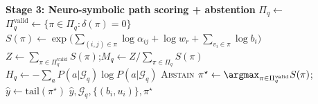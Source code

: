 \begin{algorithm}[t]
\begin{algorithmic}[1]
\Statex \textbf{Stage 3: Neuro-symbolic path scoring + abstention}
\State $\Pi_q \gets$ 
\State $\Pi_q^{\text{valid}} \gets \{\pi \in \Pi_q : \delta(\pi) = 0\}$
\State $S(\pi) \gets \exp\big(\sum_{(i,j)\in\pi}\log\alpha_{ij} + \log w_r + \sum_{v_i \in \pi}\log b_i\big)$
\State $Z \gets \sum_{\pi \in \Pi_q^{\text{valid}}} S(\pi)$;\quad $M_q \gets Z / \sum_{\pi \in \Pi_q} S(\pi)$
\State $H_q \gets -\sum_a P(a|\mathcal{G}_q)\log P(a|\mathcal{G}_q)$
  \State \Return \textsc{Abstain}
\Else
  \State $\pi^\star \gets \argmax_{\pi \in \Pi_q^{\text{valid}}} S(\pi)$;\quad $\hat{y} \gets \text{tail}(\pi^\star)$
  \State \Return $\hat{y}, \mathcal{G}_q, \{(b_i, u_i)\}, \pi^\star$
\EndIf
\end{algorithmic}
\end{algorithm}
